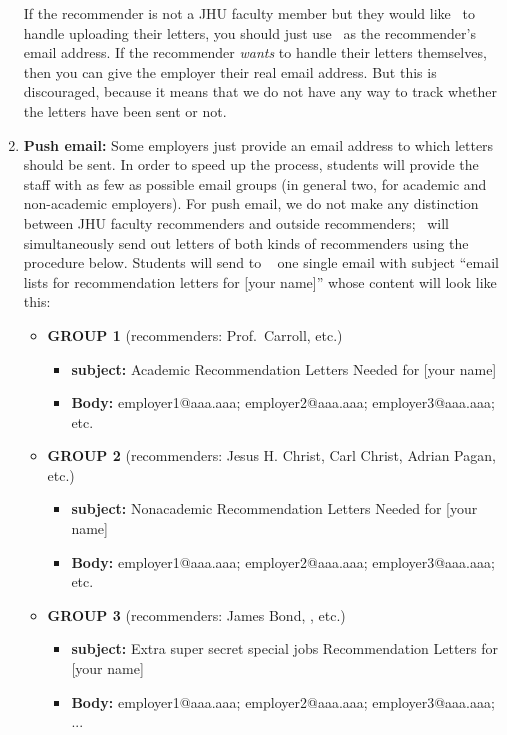 \documentclass{econtex}
\begin{document}
\begin{enumerate}
  If the recommender is not a JHU faculty member but they would like \JMStaff~to handle uploading their letters, you should just use \JMStaffEmail~as the recommender's email address.  If the recommender {\it wants} to handle their letters themselves, then you can give the employer their real email address.  But this is discouraged, because it means that we do not have any way to track whether the letters have been sent or not.

\item {\bf Push email:} Some employers just provide an email address
  to which letters should be sent.  In order to speed up the process,
  students will provide the staff with as few as possible email groups
  (in general two, for academic and non-academic employers). For push email, we do not 
make any distinction between JHU faculty recommenders and outside recommenders; \JMStaff~will
simultaneously send out letters of both kinds of recommenders using the procedure below.  Students will send to \JMStaffEmail~ one single email
  with subject ``email lists for recommendation letters for [your
  name]'' whose content will look like this: \small
\begin{itemize}
\item {\bf  GROUP 1} (recommenders: Prof.\ Carroll, etc.)
\begin{itemize}
\item {\bf  subject:} Academic Recommendation Letters Needed for [your name]
\item {\bf  Body:} employer1@aaa.aaa; employer2@aaa.aaa; employer3@aaa.aaa; etc.
\end{itemize}

\item {\bf  GROUP 2} (recommenders: Jesus H. Christ, Carl Christ, Adrian Pagan, etc.)
\begin{itemize}
\item {\bf  subject:} Nonacademic Recommendation Letters Needed for [your name]
\item {\bf  Body:} employer1@aaa.aaa; employer2@aaa.aaa; employer3@aaa.aaa; etc.
\end{itemize}

\item {\bf  GROUP 3} (recommenders: James Bond, , etc.)
\begin{itemize}
\item {\bf  subject:} Extra super secret special jobs Recommendation Letters for [your name]
\item {\bf  Body:} employer1@aaa.aaa; employer2@aaa.aaa; employer3@aaa.aaa; ...
\end{itemize}
\end{itemize}


\end{enumerate}
\end{document}
